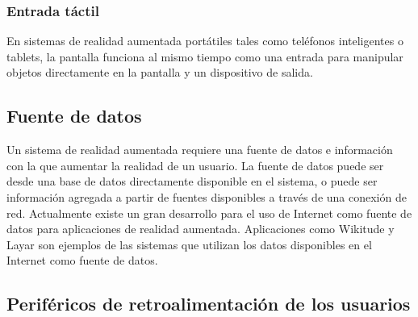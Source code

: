 \subsubsection{Entrada táctil}
En sistemas de realidad aumentada portátiles tales como teléfonos inteligentes o tablets, la pantalla funciona al mismo tiempo como una entrada para manipular objetos directamente en la pantalla y un dispositivo de salida.

\subsection{Fuente de datos}
Un sistema de realidad aumentada requiere una fuente de datos e información con la que aumentar la realidad de un usuario. La fuente de datos puede ser desde una base de datos directamente disponible en el sistema, o puede ser información agregada a partir de fuentes disponibles a través de una conexión de red. Actualmente existe un gran desarrollo para el uso de Internet como fuente de datos para aplicaciones de realidad aumentada. Aplicaciones como Wikitude y Layar son ejemplos de las sistemas que utilizan los datos disponibles en el Internet como fuente de datos.

\subsection{Periféricos de retroalimentación de los usuarios}
